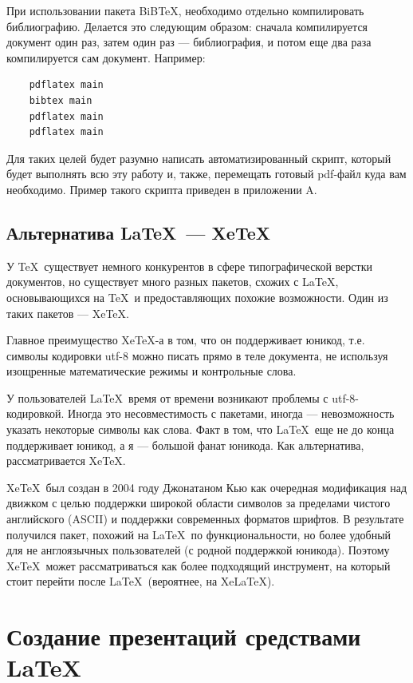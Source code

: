 При использовании пакета BiB\TeX, необходимо отдельно компилировать библиографию. Делается это следующим образом: сначала компилируется документ один раз, затем один раз --- библиография, и потом еще два раза компилируется сам документ. Например:

\begin{verbatim}
    pdflatex main
    bibtex main
    pdflatex main
    pdflatex main
\end{verbatim}

Для таких целей будет разумно написать автоматизированный скрипт, который будет выполнять всю эту работу и, также, перемещать готовый pdf-файл куда вам необходимо. Пример такого скрипта приведен в приложении A.

\subsection{Альтернатива \LaTeX~--- Xe\TeX}

У \TeX~существует немного конкурентов в сфере типографической верстки документов, но существует много разных пакетов, схожих с \LaTeX, основывающихся на \TeX~и предоставляющих похожие возможности. Один из таких пакетов --- Xe\TeX.

Главное преимущество Xe\TeX-а в том, что он поддерживает юникод, т.е. символы кодировки utf-8 можно писать прямо в теле документа, не используя изощренные математические режимы и контрольные слова.

У пользователей \LaTeX~время от времени возникают проблемы с utf-8-кодировкой. Иногда это несовместимость с пакетами, иногда --- невозможность указать некоторые символы как слова. Факт в том, что \LaTeX~еще не до конца поддерживает юникод, а я --- большой фанат юникода. Как альтернатива, рассматривается Xe\TeX.

Xe\TeX~был создан в 2004 году Джонатаном Кью как очередная модификация над движком с целью поддержки широкой области символов за пределами чистого английского (ASCII) и поддержки современных форматов шрифтов. В результате получился пакет, похожий на \LaTeX~по функциональности, но более удобный для не англоязычных пользователей (с родной поддержкой юникода). Поэтому Xe\TeX~может рассматриваться как более подходящий инструмент, на который стоит перейти после \LaTeX~(вероятнее, на Xe\LaTeX).

\section{Создание презентаций средствами \LaTeX}
\label{sec:beamer}

